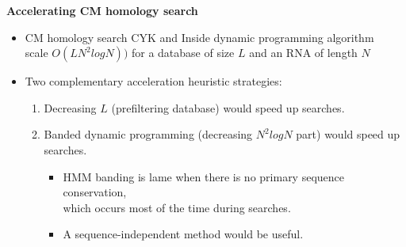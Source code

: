 \documentclass[landscape]{slides}
\begin{document}
\begin{slide}
\begin{center}
\textbf{Accelerating CM homology search}
\end{center}

\medskip
\small
\begin{itemize}

\item
CM homology search CYK and Inside dynamic programming algorithm \\ scale
$O(LN^2 log N))$ for a database of size $L$ and an RNA of length
$N$

\item Two complementary acceleration heuristic strategies:

\begin{enumerate}
\item 
Decreasing $L$ (prefiltering database) would speed up searches.

\item 
Banded dynamic programming (decreasing $N^2 logN$ part) would speed up searches.

\begin{itemize}
\item 
  HMM banding is lame when there is no primary sequence conservation, \\ which occurs most of the time during searches. 
\item 
  A sequence-independent method would be useful.
\end{itemize}
\end{enumerate}

\end{itemize}

\vfill
\end{slide}
\end{document}
